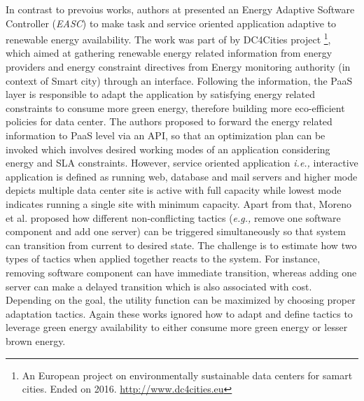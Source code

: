 In contrast to prevoius works, authors at \cite{corentin} presented an Energy Adaptive Software Controller (\emph{EASC}) to make task and service oriented application adaptive to renewable energy availability. The work was part of by DC4Cities project \footnote{An European project on environmentally sustainable data centers for samart cities. Ended on 2016. \url{http://www.dc4cities.eu}}, which aimed at gathering renewable energy related information from energy providers and energy constraint directives from Energy monitoring authority (in context of Smart city) through an interface. Following the information, the PaaS layer is responsible to adapt the application by satisfying energy related constraints to consume more green energy, therefore building more eco-efficient policies for data center. The authors proposed to forward the energy related information to PaaS level via an API, so that an optimization plan can be invoked which involves desired working modes of an application considering energy and SLA constraints. However, service oriented application \emph{i.e.,} interactive application is defined as running web, database and mail servers and higher mode depicts multiple data center site is active with full capacity while lowest mode indicates running a single site with minimum capacity. Apart from that, Moreno et al. \cite{garlan1} proposed how different non-conflicting tactics (\emph{e.g.,} remove one software component and add one server) can be triggered simultaneously so that system can transition from current to desired state. The challenge is to estimate how two types of tactics when applied together reacts to the system. For instance, removing software component can have immediate transition, whereas adding one server can make a delayed transition which is also associated with cost. Depending on the goal, the utility function can be maximized by choosing proper adaptation tactics. Again these works ignored how to adapt and define tactics to leverage green energy availability to either consume more green energy or lesser brown energy.

